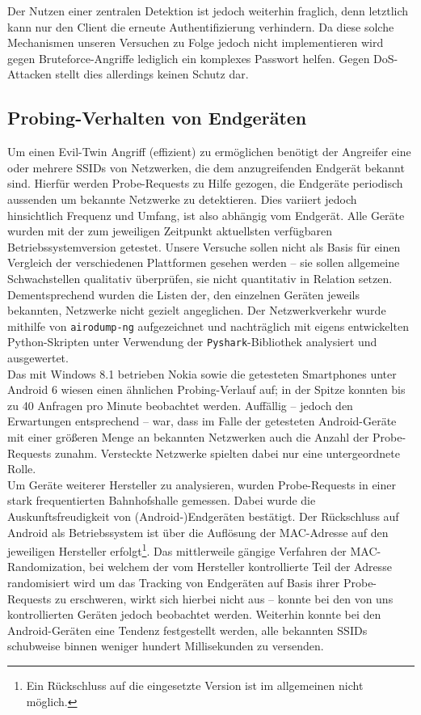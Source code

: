 Der Nutzen einer zentralen Detektion ist jedoch weiterhin fraglich, denn letztlich kann nur den Client die erneute Authentifizierung verhindern. Da diese solche Mechanismen unseren Versuchen zu Folge jedoch nicht implementieren wird gegen Bruteforce-Angriffe lediglich ein komplexes Passwort helfen. Gegen DoS-Attacken stellt dies allerdings keinen Schutz dar.

\subsection{Probing-Verhalten von Endgeräten}\label{subs:praxisprobes}
Um einen Evil-Twin Angriff (effizient) zu ermöglichen benötigt der Angreifer eine oder mehrere SSIDs von Netzwerken, die dem anzugreifenden Endgerät bekannt sind.
Hierfür werden Probe-Requests zu Hilfe gezogen, die Endgeräte periodisch aussenden um bekannte Netzwerke zu detektieren.
Dies variiert jedoch hinsichtlich Frequenz und Umfang, ist also abhängig vom Endgerät.
Alle Geräte wurden mit der zum jeweiligen Zeitpunkt aktuellsten verfügbaren Betriebssystemversion getestet. Unsere Versuche sollen nicht als Basis für einen Vergleich der verschiedenen Plattformen gesehen werden -- sie sollen allgemeine Schwachstellen qualitativ überprüfen, sie nicht quantitativ in Relation setzen. Dementsprechend wurden die Listen der, den einzelnen Geräten jeweils bekannten, Netzwerke nicht gezielt angeglichen. Der Netzwerkverkehr wurde mithilfe von \texttt{airodump-ng} aufgezeichnet und nachträglich mit eigens entwickelten Python-Skripten unter Verwendung der \texttt{Pyshark}-Bibliothek analysiert und ausgewertet.\\

Das mit Windows 8.1 betrieben Nokia sowie die getesteten Smartphones unter Android 6 wiesen einen ähnlichen Probing-Verlauf auf; in der Spitze konnten bis zu 40 Anfragen pro Minute beobachtet werden.
Auffällig -- jedoch den Erwartungen entsprechend -- war, dass im Falle der getesteten Android-Geräte mit einer größeren Menge an bekannten Netzwerken auch die Anzahl der Probe-Requests zunahm. Versteckte Netzwerke spielten dabei nur eine untergeordnete Rolle.\\

Um Geräte weiterer Hersteller zu analysieren, wurden Probe-Requests in einer stark frequentierten Bahnhofshalle gemessen. Dabei wurde die Auskunftsfreudigkeit von (Android-)Endgeräten bestätigt. Der Rückschluss auf Android als Betriebssystem ist über die Auflösung der MAC-Adresse auf den jeweiligen Hersteller erfolgt\footnote{Ein Rückschluss auf die eingesetzte Version ist im allgemeinen nicht möglich.}.
Das mittlerweile gängige Verfahren der MAC-Randomization, bei welchem der vom Hersteller kontrollierte Teil der Adresse randomisiert wird um das Tracking von Endgeräten auf Basis ihrer Probe-Requests zu erschweren, wirkt sich hierbei nicht aus -- konnte bei den von uns kontrollierten Geräten jedoch beobachtet werden.
Weiterhin konnte bei den Android-Geräten eine Tendenz festgestellt werden, alle bekannten SSIDs schubweise binnen weniger hundert Millisekunden zu versenden.\\

